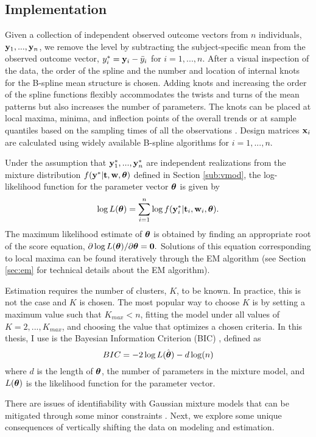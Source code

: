 \subsection{Implementation}
Given a collection of independent observed outcome vectors from $n$ individuals, $\mathbf y_{1},...,\mathbf y_{n}$, we remove the level by subtracting the subject-specific mean from the observed outcome vector, $y^{*}_{i} = \mathbf y_{i} - \bar{y}_{i}$ for $i=1,...,n$. After a visual inspection of the data, the order of the spline and the number and location of internal knots for the B-spline mean structure is chosen. Adding knots and increasing the order of the spline functions flexibly accommodates the twists and turns of the mean patterns but also increases the number of parameters. The knots can be placed at local maxima, minima, and inflection points of the overall trends \cite{eubank1999} or at sample quantiles based on the sampling times of all the observations \cite{ruppert2002}. Design matrices $\mathbf x_{i}$ are calculated using widely available B-spline algorithms for $i=1,...,n$. 

Under the assumption that $\mathbf y^{*}_{1},...,\mathbf y^{*}_{n}$ are independent realizations from the mixture distribution $f(\mathbf y^{*} | \mathbf t, \mathbf w, \boldsymbol\theta)$ defined in Section \ref{sub:vmod}, the log-likelihood function for the parameter vector $\boldsymbol \theta$ is given by
$$\log L(\boldsymbol\theta)=\sum^{n}_{i=1}\log f(\mathbf y^{*}_{i}|\mathbf t_{i},\mathbf w_{i},\boldsymbol \theta).$$
The maximum likelihood estimate of $\boldsymbol\theta$ is obtained by finding an appropriate root of the score equation, $\partial \log L(\boldsymbol\theta)/\partial \boldsymbol\theta=\mathbf 0.$ Solutions of this equation corresponding to local maxima can be found iteratively through the EM algorithm \cite{dempster1977} (see Section \ref{sec:em} for technical details about the EM algorithm).

Estimation requires the number of clusters, $K$, to be known. In practice, this is not the case and $K$ is chosen. The most popular way to choose $K$ is by setting a maximum value such that $K_{max}<n$, fitting the model under all values of $K=2,...,K_{max}$, and choosing the value that optimizes a chosen criteria. In this thesis, I use is the Bayesian Information Criterion (BIC) \cite{schwarz1978}, defined as
$$BIC = -2\log L(\hat{\boldsymbol\theta})- d\log(n)$$
where $d$ is the length of $\boldsymbol\theta$, the number of parameters in the mixture model, and $L(\boldsymbol\theta)$ is the likelihood function for the parameter vector.

There are issues of identifiability with Gaussian mixture models that can be mitigated through some minor constraints \cite{mclachlan2000}. Next, we explore some unique consequences of vertically shifting the data on modeling and estimation.

